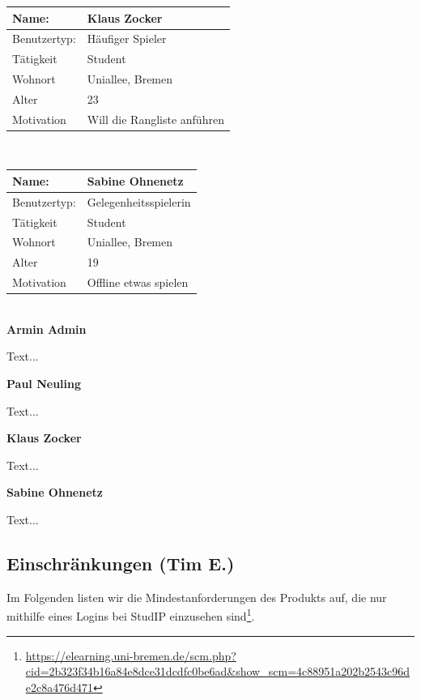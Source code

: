 \documentclass[fontsize=12pt,paper=a4,twoside]{scrartcl}
\begin{document}
    	\begin{tabular}{|p{}|p{}|}\hline
        \textbf{Name:} &  \textbf{Klaus Zocker}\\\hline
       Benutzertyp: & Häufiger Spieler \\\hline
       Tätigkeit	& Student\\\hline
       Wohnort & Uniallee, Bremen\\\hline
       Alter	 & 23\\\hline
       Motivation & Will die Rangliste anführen\\\hline
    \end{tabular}\\
    
    \begin{tabular}{|p{}|p{}|}\hline
        \textbf{Name:} &  \textbf{Sabine Ohnenetz}\\\hline
       Benutzertyp: & Gelegenheitsspielerin \\\hline
       Tätigkeit	& Student\\\hline
       Wohnort & Uniallee, Bremen\\\hline
       Alter	 & 19\\\hline
       Motivation & Offline etwas spielen \\\hline
    \end{tabular}\\
    
    \textbf{Armin Admin}
    
    Text...
    
    \textbf{Paul Neuling}
    
    Text...
    
    \textbf{Klaus Zocker}
    
    Text...
    
    \textbf{Sabine Ohnenetz}
    
    Text...
  
  \subsection{Einschränkungen (Tim E.)}\label{einschraenkungen}

Im Folgenden listen wir die Mindestanforderungen des Produkts auf, die nur mithilfe eines Logins bei StudIP einzusehen sind\footnote{\url{https://elearning.uni-bremen.de/scm.php?cid=2b323f34b16a84e8dce31dcdfc0be6ad\&show\_scm=4c88951a202b2543c96de2c8a476d471}}.
\end{document}
